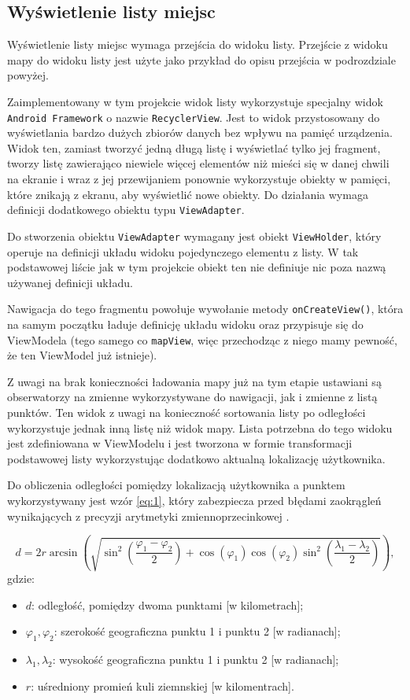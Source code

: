 \documentclass[polish,polish,a4paper,12pt]{article}
\begin{document}
	\subsection{Wyświetlenie listy miejsc}

	Wyświetlenie listy miejsc wymaga przejścia do widoku listy. Przejście z widoku mapy do widoku listy jest użyte jako przykład do opisu przejścia w podrozdziale powyżej.

	Zaimplementowany w tym projekcie widok listy wykorzystuje specjalny widok \texttt{Android Framework} o nazwie \texttt{RecyclerView}. Jest to widok przystosowany do wyświetlania bardzo dużych zbiorów danych bez wpływu na pamięć urządzenia. Widok ten, zamiast tworzyć jedną długą listę i wyświetlać tylko jej fragment, tworzy listę zawierająco niewiele więcej elementów niż mieści się w danej chwili na ekranie i wraz z jej przewijaniem ponownie wykorzystuje obiekty w pamięci, które znikają z ekranu, aby wyświetlić nowe obiekty. Do działania wymaga definicji dodatkowego obiektu typu \texttt{ViewAdapter}.

	Do stworzenia obiektu \texttt{ViewAdapter} wymagany jest obiekt \texttt{ViewHolder}, który operuje na definicji układu widoku pojedynczego elementu z listy. W tak podstawowej liście jak w tym projekcie obiekt ten nie definiuje nic poza nazwą używanej definicji układu.

	Nawigacja do tego fragmentu powołuje wywołanie metody \texttt{onCreateView()}, która na samym początku ładuje definicję układu widoku oraz przypisuje się do ViewModela (tego samego co \texttt{mapView}, więc przechodząc z niego mamy pewność, że ten ViewModel już istnieje).

	Z uwagi na brak konieczności ładowania mapy już na tym etapie ustawiani są obserwatorzy na zmienne wykorzystywane do nawigacji, jak i zmienne z listą punktów. Ten widok z uwagi na konieczność sortowania listy po odległości wykorzystuje jednak inną listę niż widok mapy. Lista potrzebna do tego widoku jest zdefiniowana w ViewModelu i jest tworzona w formie transformacji podstawowej listy wykorzystując dodatkowo aktualną lokalizację użytkownika.

	Do obliczenia odległości pomiędzy lokalizacją użytkownika a punktem wykorzystywany jest wzór \ref{eq:1}, który zabezpiecza przed błędami zaokrągleń wynikających z precyzji arytmetyki zmiennoprzecinkowej \cite{haversineformulawiki}.

	\begin{equation}
d = 2r\arcsin(\sqrt{\sin^2(\frac{\varphi_1-\varphi_2}{2})+\cos(\varphi_1)\cos(\varphi_2)\sin^2(\frac{\lambda_1-\lambda_2}{2})}),\label{eq:1}
	\end{equation}
	gdzie:
	\begin{itemize}
		\item $ d $: odległość, pomiędzy dwoma punktami [w kilometrach];
		\item $ \varphi_1, \varphi_2 $: szerokość geograficzna punktu 1 i punktu 2 [w radianach];
		\item $ \lambda_1, \lambda_2 $: wysokość geograficzna punktu 1 i punktu 2 [w radianach];
		\item $ r $: uśredniony promień kuli ziemnskiej [w kilomentrach].
	\end{itemize}
\end{document}
